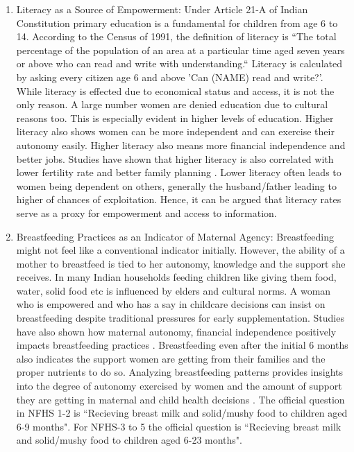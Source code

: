 \begin{enumerate}
\item Literacy as a Source of Empowerment:
 Under Article 21-A of Indian Constitution primary education is a fundamental for children from age 6 to 14. According to the Census of 1991, the definition of literacy is ``The total percentage of the population of an area at a particular time aged seven years or above who can read and write with understanding.`` Literacy is calculated by asking every citizen  age 6 and above 'Can (NAME) read and write?'. While literacy is effected due to economical status and access, it is not the only reason.  A large number women are denied education due to cultural reasons too. This is especially evident in higher levels of education. Higher literacy also shows women can be more independent and can exercise their autonomy easily. Higher literacy also means more financial independence and better jobs. Studies have shown that higher literacy is also correlated with lower fertility rate and better family planning \citep{kumar2022measuring}. Lower literacy often leads to women being dependent on others, generally the husband/father leading to higher of chances of exploitation. Hence, it can be argued that literacy rates serve as a proxy for  empowerment and access to information. 

\item  Breastfeeding Practices as an Indicator of Maternal Agency: Breastfeeding might not feel like a conventional indicator initially. However, the ability of a mother to breastfeed  is  tied to her autonomy, knowledge and the support she receives. In many Indian households feeding children like giving them food, water, solid food etc is influenced by elders and cultural norms. A woman who is empowered and who has a say in childcare decisions can insist on  breastfeeding despite traditional pressures for early supplementation. Studies have also shown how maternal autonomy, financial independence positively impacts breastfeeding practices \citep{shroff2011does}. Breastfeeding even after the initial 6 months also indicates the support women are getting from their families and the proper nutrients to do so. Analyzing breastfeeding patterns provides insights into the degree of autonomy exercised by women and the amount of support they are getting  in maternal and child health decisions \citep{Delawarde-Saïas2024}. The official question in NFHS 1-2 is ``Recieving breast milk and solid/mushy food to children aged 6-9 months". For NFHS-3 to 5 the official question is ``Recieving breast milk and solid/mushy food to children aged 6-23 months".
\end{enumerate}

